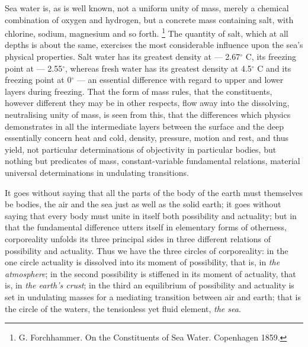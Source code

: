 \documentclass[12pt,a4paper]{book}
\renewcommand{\thefootnote}{*)}
\begin{document}
Sea water is, as is well known, not a uniform unity of mass, merely a chemical combination of oxygen and hydrogen, but a
concrete mass containing salt, with chlorine, sodium, magnesium and so forth.%
\renewcommand{\thefootnote}{**)}%
\footnote{%
G. Forchhammer. On the Constituents of Sea Water. Copenhagen 1859.}%
\renewcommand{\thefootnote}{*)}
The quantity of salt, which at all depths is about the same, exercises the most considerable influence upon the sea's
physical properties. Salt water has its greatest
density at --- 2.67$^{\circ}$ C, its freezing point at --- 2.55$^{\circ}$, whereas fresh water has its greatest density
at 4.5$^{\circ}$ C and its freezing point at 0$^{\circ}$ --- an essential difference with regard to upper and lower
layers during freezing. That the form of mass rules, that the constituents, however different they may be in other
respects, flow away into the dissolving, neutralising unity of mass, is seen from this, that the differences which
physics demonstrates in all the intermediate layers between the surface and the deep essentially concern heat and cold,
density, pressure, motion and rest, and thus yield, not particular determinations of objectivity in particular bodies,
but nothing but predicates of mass, constant-variable fundamental relations, material universal determinations in
undulating transitions.

It goes without saying that all the parts of the body of the earth must themselves be bodies, the air and the sea just as
well as the solid earth; it goes without saying that every body must unite in itself both possibility and actuality; but
in that the fundamental difference utters itself in elementary forms of otherness, corporeality unfolds its three
principal sides in three different relations of possibility and actuality. Thus we have the three circles of
corporeality: in the one circle actuality is dissolved into its moment of possibility, that is, in \emph{the atmosphere};
in the second possibility is stiffened in its moment of actuality, that is, in \emph{the earth's crust}; in the third an
equilibrium of possibility and actuality is set in undulating masses for a mediating transition between air and earth;
that is the circle of the waters, the tensionless yet fluid element, \emph{the sea}.
\end{document}
